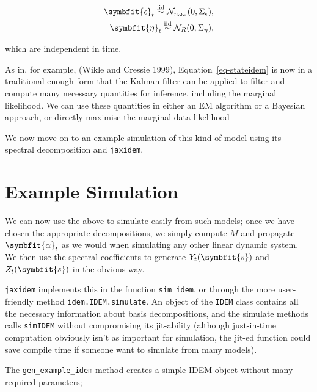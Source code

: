 \documentclass[
]{report}
\newcommand{\bv}[1]{\symbfit{#1}}
\theoremstyle{plain}
\theoremstyle{plain}
\theoremstyle{remark}
\begin{document}
\[\begin{split}
\bv \epsilon_{t} \overset{\mathrm{iid}}{\sim} \mathcal N_{n_\mathrm{obs}}(0,\Sigma_\epsilon),\\
\bv \eta_{t} \overset{\mathrm{iid}}{\sim} \mathcal N_{R}(0,\Sigma_\eta),
\end{split}
\]

which are independent in time.

As in, for example, (Wikle and Cressie 1999),
Equation~\ref{eq-stateidem} is now in a traditional enough form that the
Kalman filter can be applied to filter and compute many necessary
quantities for inference, including the marginal likelihood. We can use
these quantities in either an EM algorithm or a Bayesian approach, or
directly maximise the marginal data likelihood

We now move on to an example simulation of this kind of model using its
spectral decomposition and \texttt{jaxidem}.

\section{Example Simulation}\label{example-simulation}

We can now use the above to simulate easily from such models; once we
have chosen the appropriate decompositions, we simply compute \(M\) and
propagate \(\bv \alpha_t\) as we would when simulating any other linear
dynamic system. We then use the spectral coefficients to generate
\(Y_t(\bv s)\) and \(Z_t(\bv s)\) in the obvious way.

\texttt{jaxidem} implements this in the function \texttt{sim\_idem}, or
through the more user-friendly method \texttt{idem.IDEM.simulate}. An
object of the \texttt{IDEM} class contains all the necessary information
about basis decompositions, and the simulate methods calls
\texttt{simIDEM} without compromising its jit-ability (although
just-in-time computation obviously isn't as important for simulation,
the jit-ed function could save compile time if someone want to simulate
from many models).

The \texttt{gen\_example\_idem} method creates a simple IDEM object
without many required parameters;
\end{document}
